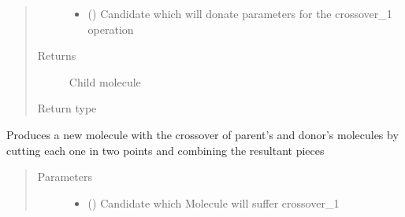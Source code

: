 \documentclass[letterpaper,10pt,english]{sphinxmanual}
\begin{document}
\begin{fulllineitems}
\begin{fulllineitems}
\begin{quote}
\begin{description}
\begin{itemize}
\item {} 
\sphinxAtStartPar
{} ({\hyperref[\detokenize{genetic:genetic.Chromosome}]{}}) \textendash{} Candidate which will donate parameters for the crossover\_1 operation

\end{itemize}

\item[{Returns}] \leavevmode
\sphinxAtStartPar
Child molecule

\item[{Return type}] \leavevmode
\sphinxAtStartPar
{\hyperref[\detokenize{molecular:molecular.Molecule}]{}}

\end{description}\end{quote}

\end{fulllineitems}


\begin{fulllineitems}
\label{\detokenize{MolOpt:MolOpt.MolOpt.crossover_2}}
\sphinxAtStartPar
Produces a new molecule with the crossover of parent’s and donor’s molecules by cutting each one in two
points and combining the resultant pieces
\begin{quote}\begin{description}
\item[{Parameters}] \leavevmode\begin{itemize}
\item {} 
\sphinxAtStartPar
{} ({\hyperref[\detokenize{genetic:genetic.Chromosome}]{}}) \textendash{} Candidate which Molecule will suffer crossover\_1


\end{itemize}
\end{description}
\end{quote}
\end{fulllineitems}
\end{fulllineitems}
\end{document}
